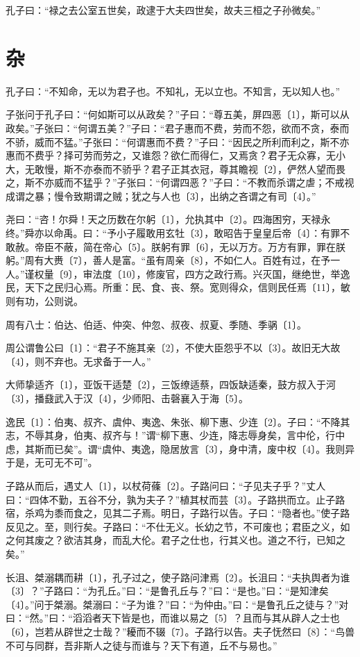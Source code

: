 \documentclass[a5paper]{ctexbook}
\begin{document}
    孔子曰：“禄之去公室五世矣，政逮于大夫四世矣，故夫三桓之子孙微矣。”

    \chapter{杂}

    孔子曰：“不知命，无以为君子也。不知礼，无以立也。不知言，无以知人也。”

    子张问于孔子曰：“何如斯可以从政矣？”子曰：“尊五美，屏四恶〔1〕，斯可以从政矣。”子张曰：“何谓五美？”子曰：“君子惠而不费，劳而不怨，欲而不贪，泰而不骄，威而不猛。”子张曰：“何谓惠而不费？”子曰：“因民之所利而利之，斯不亦惠而不费乎？择可劳而劳之，又谁怨？欲仁而得仁，又焉贪？君子无众寡，无小大，无敢慢，斯不亦泰而不骄乎？君子正其衣冠，尊其瞻视〔2〕，俨然人望而畏之，斯不亦威而不猛乎？”子张曰：“何谓四恶？”子曰：“不教而杀谓之虐；不戒视成谓之暴；慢令致期谓之贼；犹之与人也〔3〕，出纳之吝谓之有司〔4〕。”

    尧曰：“咨！尔舜！天之历数在尔躬〔1〕，允执其中〔2〕。四海困穷，天禄永终。”舜亦以命禹。曰：“予小子履敢用玄牡〔3〕，敢昭告于皇皇后帝〔4〕：有罪不敢赦。帝臣不蔽，简在帝心〔5〕。朕躬有罪〔6〕，无以万方。万方有罪，罪在朕躬。”周有大赉〔7〕，善人是富。“虽有周亲〔8〕，不如仁人。百姓有过，在予一人。”谨权量〔9〕，审法度〔10〕，修废官，四方之政行焉。兴灭国，继绝世，举逸民，天下之民归心焉。所重：民、食、丧、祭。宽则得众，信则民任焉〔11〕，敏则有功，公则说。

    周有八士：伯达、伯适、仲突、仲忽、叔夜、叔夏、季随、季䯄〔1〕。

    周公谓鲁公曰〔1〕：“君子不施其亲〔2〕，不使大臣怨乎不以〔3〕。故旧无大故〔4〕，则不弃也。无求备于一人。”

    大师挚适齐〔1〕，亚饭干适楚〔2〕，三饭缭适蔡，四饭缺适秦，鼓方叔入于河〔3〕，播鼗武入于汉〔4〕，少师阳、击磬襄入于海〔5〕。

    逸民〔1〕：伯夷、叔齐、虞仲、夷逸、朱张、柳下惠、少连〔2〕。子曰：“不降其志，不辱其身，伯夷、叔齐与！”谓“柳下惠、少连，降志辱身矣，言中伦，行中虑，其斯而已矣”。谓“虞仲、夷逸，隐居放言〔3〕，身中清，废中权〔4〕。我则异于是，无可无不可”。

    子路从而后，遇丈人〔1〕，以杖荷蓧〔2〕。子路问曰：“子见夫子乎？”丈人曰：“四体不勤，五谷不分，孰为夫子？”植其杖而芸〔3〕。子路拱而立。止子路宿，杀鸡为黍而食之，见其二子焉。明日，子路行以告。子曰：“隐者也。”使子路反见之。至，则行矣。子路曰：“不仕无义。长幼之节，不可废也；君臣之义，如之何其废之？欲洁其身，而乱大伦。君子之仕也，行其义也。道之不行，已知之矣。”

    长沮、桀溺耦而耕〔1〕，孔子过之，使子路问津焉〔2〕。长沮曰：“夫执舆者为谁〔3〕？”子路曰：“为孔丘。”曰：“是鲁孔丘与？”曰：“是也。”曰：“是知津矣〔4〕。”问于桀溺。桀溺曰：“子为谁？”曰：“为仲由。”曰：“是鲁孔丘之徒与？”对曰：“然。”曰：“滔滔者天下皆是也，而谁以易之〔5〕？且而与其从辟人之士也〔6〕，岂若从辟世之士哉？”耰而不辍〔7〕。子路行以告。夫子怃然曰〔8〕：“鸟兽不可与同群，吾非斯人之徒与而谁与？天下有道，丘不与易也。”
\end{document}
